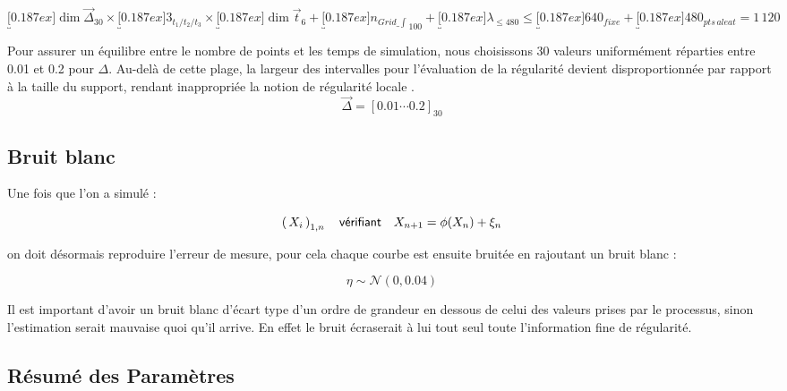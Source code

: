 $$\underbracket[0.187ex]{\dim \vec\Delta}_{30} \times \underbracket[0.187ex]{3}_{t_1 / t_2 / t_3} \times \underbracket[0.187ex]{\dim \vec t}_{6} + \underbracket[0.187ex]{n_{Grid\_\int}}_{100} + \underbracket[0.187ex]{\lambda}_{\leq 480} \leq \underbracket[0.187ex]{640}_{fixe} + \underbracket[0.187ex]{480}_{pts \, aleat} = 1 \, 120$$



Pour assurer un équilibre entre le nombre de points et les temps de simulation, nous choisissons 30 valeurs uniformément réparties entre 0.01 et 0.2 pour $\Delta$. Au-delà de cette plage, la largeur des intervalles pour l'évaluation de la régularité devient disproportionnée par rapport à la taille du support, rendant inappropriée la notion de \og régularité locale \fg.
$$
	\vec \Delta = \left[ 0.01 \cdots  0.2 \right]_{30}
$$

\subsection{Bruit blanc}


Une fois que l'on a simulé :

$$
	\left( \, {X} _ {i} \, \right)_{1, n} \quad \textsf{vérifiant} \quad X_{n+1} = \phi(X_n) + \xi_n
$$

on doit désormais reproduire l'erreur de mesure, pour cela chaque courbe est ensuite bruitée en rajoutant un bruit blanc :

$$
	\eta \sim \mathcal N ( 0, 0.04 )
$$

Il est important d'avoir un bruit blanc d'écart type d'un ordre de grandeur en dessous de celui des valeurs prises par le processus, sinon l'estimation serait mauvaise quoi qu'il arrive. En effet le bruit écraserait à lui tout seul toute l'information fine de régularité.


\subsection{Résumé des Paramètres}

